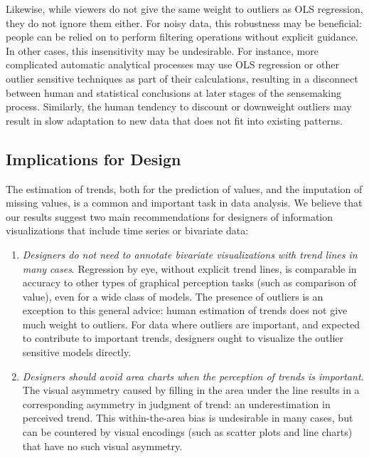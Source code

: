 \documentclass{sigchi}
\begin{document}
Likewise, while viewers do not give the same weight to outliers as OLS regression, they do not ignore them either. For noisy data, this robustness may be beneficial: people can be relied on to perform filtering operations without explicit guidance. In other cases, this insensitivity may be undesirable. For instance, more complicated automatic analytical processes may use OLS regression or other outlier sensitive techniques as part of their calculations, resulting in a disconnect between human and statistical conclusions at later stages of the sensemaking process. Similarly, the human tendency to discount or downweight outliers may result in slow adaptation to new data that does not fit into existing patterns.

\subsection{Implications for Design}

The estimation of trends, both for the prediction of values, and the imputation of missing values, is a common and important task in data analysis. We believe that our results suggest two main recommendations for designers of information visualizations that include time series or bivariate data:

\begin{enumerate}
	\item \emph{Designers do not need to annotate bivariate visualizations with trend lines in many cases}. Regression by eye, without explicit trend lines, is comparable in accuracy to other types of graphical perception tasks (such as comparison of value), even for a wide class of models. The presence of outliers is an exception to this general advice: human estimation of trends does not give much weight to outliers. For data where outliers are important, and expected to contribute to important trends, designers ought to visualize the outlier sensitive models directly.
	
	\item \emph{Designers should avoid area charts when the perception of trends is important.} The visual asymmetry caused by filling in the area under the line results in a corresponding asymmetry in judgment of trend: an underestimation in perceived trend. This within-the-area bias is undesirable in many cases, but can be countered by visual encodings (such as scatter plots and line charts) that have no such visual asymmetry.
\end{enumerate}
\end{document}

